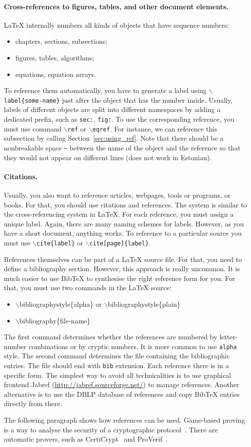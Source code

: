 \paragraph{Cross-references to figures, tables, and other document elements.}
LaTeX  internally numbers all kinds of objects that have sequence numbers:
\begin{itemize}
\item chapters, sections, subsections;
\item figures, tables, algorithms;
\item equations, equation arrays.
\end{itemize}
To reference them automatically, you have to generate a label using \texttt{$\backslash$label\{some-name\}} just after the object that has the number inside. Usually, labels of different objects are split into different namespaces by adding a dedicated prefix, such as \texttt{sec:}, \texttt{fig:}. To use the corresponding reference, you must use command \texttt{$\backslash$ref} or \texttt{$\backslash$eqref}. For instance, we can reference this subsection by calling Section~\ref{sec:using_ref}. Note that there should be a nonbreakable space \texttt{\~} between the name of the object and the reference so that they would not appear on different lines (does not work in Estonian).



\paragraph{Citations.}
Usually, you also want to reference articles, webpages, tools or programs, or books. For that, you should use citations and references. The system is similar to the cross-referencing system in LaTeX. For each reference, you must assign a unique label. Again, there are many naming schemes for labels. However, as you have a short document, anything works. To reference to a particular source you must use \texttt{$\backslash$cite\{label\}} or \texttt{$\backslash$cite[page]\{label\}}.

References themselves can be part of a LaTeX source file. For that, you need to define a bibliography section. However, this approach is really uncommon. It is much easier to use BibTeX to synthesise the right reference form for you. For that, you must use two commands in the LaTeX source:
\begin{itemize}
\item $\backslash$bibliographystyle\{alpha\} or $\backslash$bibliographystyle\{plain\}
\item $\backslash$bibliography\{file-name\}
\end{itemize}
The first command determines whether the references are numbered by letter-number combinations or by cryptic numbers. It is more common to use \texttt{alpha} style. The second command determines the file containing the bibliographic entries. The file should end with \texttt{bib} extension. Each reference there is in a specific form. The simplest way to avoid all technicalities is to use graphical frontend  Jabref (\url{http://jabref.sourceforge.net/}) to manage references. Another alternative is to use the DBLP database of references and copy BibTeX entries directly from there.


The following paragraph shows how references can be used. Game-based proving is a way to analyse the security of a cryptographic protocol~\cite{GameB_1, GameB_2}. There are automatic provers, such as {CertiCrypt\-}~\cite{certiCrypt} and ProVerif~\cite{proVerif}.
